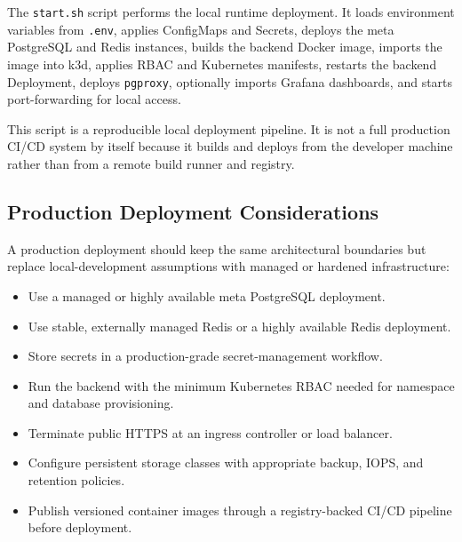The \texttt{start.sh} script performs the local runtime deployment. It loads environment variables from \texttt{.env}, applies ConfigMaps and Secrets, deploys the meta PostgreSQL and Redis instances, builds the backend Docker image, imports the image into k3d, applies RBAC and Kubernetes manifests, restarts the backend Deployment, deploys \texttt{pgproxy}, optionally imports Grafana dashboards, and starts port-forwarding for local access.

This script is a reproducible local deployment pipeline. It is not a full production CI/CD system by itself because it builds and deploys from the developer machine rather than from a remote build runner and registry.

\subsection{Production Deployment Considerations}

A production deployment should keep the same architectural boundaries but replace local-development assumptions with managed or hardened infrastructure:

\begin{itemize}
    \item Use a managed or highly available meta PostgreSQL deployment.
    \item Use stable, externally managed Redis or a highly available Redis deployment.
    \item Store secrets in a production-grade secret-management workflow.
    \item Run the backend with the minimum Kubernetes RBAC needed for namespace and database provisioning.
    \item Terminate public HTTPS at an ingress controller or load balancer.
    \item Configure persistent storage classes with appropriate backup, IOPS, and retention policies.
    \item Publish versioned container images through a registry-backed CI/CD pipeline before deployment.
\end{itemize}
